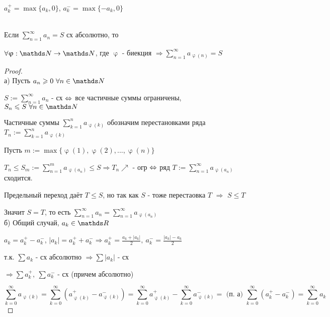 \documentclass[11pt, fleqn]{article}
\begin{document}
\begin{Property}[3]
\begin{Property}[4]
\begin{Property}[2, аддитивность]
\begin{definition}
    $a_k^+ = \max\{a_k, 0\}$, $a_k^- = \max\{-a_k, 0\}$
\end{definition}

\begin{theorem}  \ \\
    Если $\sum\limits_{n=1}^\infty a_n= S$ сх абсолютно, то
    
    $\forall \upvarphi: \N \rightarrow \N$, где $\upvarphi$ - биекция $\Rightarrow \sum\limits_{n=1}^\infty a_{\upvarphi(n)} = S$
\end{theorem}

\begin{proof}\\
    а) Пусть $a_n \geqslant 0\ \forall n \in \N$
    
    $S := \sum\limits_{n=1}^\infty a_n$ - сх $\Leftrightarrow$ все частичные суммы ограничены,  $S_n \leqslant S\ \forall n \in \N$
    
    Частичные суммы $\sum\limits_{k=1}^n a_{\upvarphi(k)}$ обозначим перестановками ряда $T_n := \sum\limits_{k=1}^n a_{\upvarphi(k)}$
    
    Пусть $m:=\max \{\upvarphi(1), \upvarphi(2), ..., \upvarphi(n) \}$
    
    $T_n \leqslant S_m := \sum\limits_{n=1}^m a_{\upvarphi(a_n)} \leqslant S \Rightarrow T_n \nearrow$ - огр $\Leftrightarrow$ ряд $T := \sum\limits_{n=1}^\infty a_{\upvarphi(a_n)}$ сходится.
    
    Предельный переход даёт $T \leqslant S$, но так как $S$ - тоже перестаовка $T$ $\Rightarrow$ $S \leqslant T$

    Значит $S=T$, то есть $\sum\limits_{n=1}^\infty a_n = \sum\limits_{n=1}^\infty a_{\upvarphi(a_n)}$
    \\
    б) Общий случай, $a_k \in \R $
    
    $a_k = a_k^+ - a_k^-$, $|a_k| = a_k^+ + a_k^- \Rightarrow a_k^+ = \frac{a_k + |a_k|}{2},\ a_k^-=\frac{|a_k|-a_k}{2}$
    
    т.к. $\sum a_k$ - сх абсолютно $\Rightarrow \sum |a_k|$ - сх
    
    $\Rightarrow \sum a_k^+,\ \sum a_k^-$ - сх (причем абсолютно)
    
    $$\sum\limits_{k=0}^\infty a_{\upvarphi(k)} = \sum\limits_{k=0}^\infty (a_{\upvarphi(k)}^+ - a_{\upvarphi(k)}^-) = \sum\limits_{k=0}^\infty a_{\upvarphi(k)}^+ - \sum\limits_{k=0}^\infty a_{\upvarphi(k)}^- =\text{ (п. а) }\sum\limits_{k=0}^\infty (a_k^+ - a_k^-) = \sum\limits_{k=0}^\infty a_k$$
\end{proof}


\end{Property}
\end{Property}
\end{Property}
\end{document}
